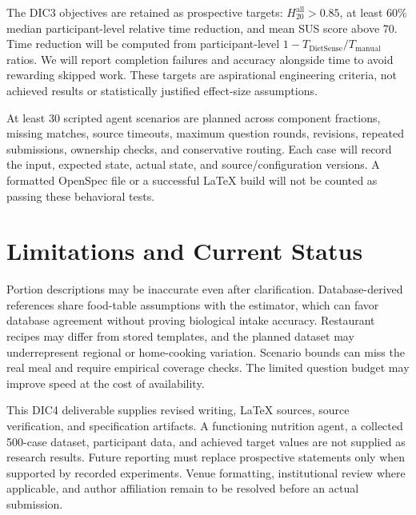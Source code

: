 \documentclass[11pt,a4paper]{article}
\begin{document}
The DIC3 objectives are retained as prospective targets: $H_{20}^{\mathrm{all}}>0.85$, at least 60\% median participant-level relative time reduction, and mean SUS score above 70. Time reduction will be computed from participant-level $1-T_{\mathrm{DietSense}}/T_{\mathrm{manual}}$ ratios. We will report completion failures and accuracy alongside time to avoid rewarding skipped work. These targets are aspirational engineering criteria, not achieved results or statistically justified effect-size assumptions.

At least 30 scripted agent scenarios are planned across component fractions, missing matches, source timeouts, maximum question rounds, revisions, repeated submissions, ownership checks, and conservative routing. Each case will record the input, expected state, actual state, and source/configuration versions. A formatted OpenSpec file or a successful LaTeX build will not be counted as passing these behavioral tests.

\section{Limitations and Current Status}
Portion descriptions may be inaccurate even after clarification. Database-derived references share food-table assumptions with the estimator, which can favor database agreement without proving biological intake accuracy. Restaurant recipes may differ from stored templates, and the planned dataset may underrepresent regional or home-cooking variation. Scenario bounds can miss the real meal and require empirical coverage checks. The limited question budget may improve speed at the cost of availability.

This DIC4 deliverable supplies revised writing, LaTeX sources, source verification, and specification artifacts. A functioning nutrition agent, a collected 500-case dataset, participant data, and achieved target values are not supplied as research results. Future reporting must replace prospective statements only when supported by recorded experiments. Venue formatting, institutional review where applicable, and author affiliation remain to be resolved before an actual submission.
\end{document}
